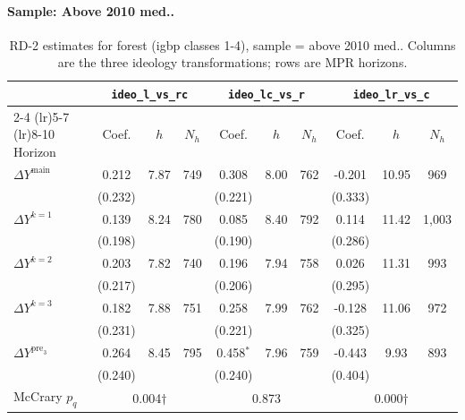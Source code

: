 \documentclass[11pt]{article}
\begin{document}
\paragraph{Sample: Above 2010 med..}
\begin{table}[H]
\centering
\scriptsize
\caption{RD-2 estimates for forest (igbp classes 1-4), sample = above 2010 med..
Columns are the three ideology transformations; rows are MPR horizons.}
\label{tab:rd2_forest_above}
\begin{tabular}{l ccc ccc ccc}
\toprule
 & \multicolumn{3}{c}{\texttt{ideo\_l\_vs\_rc}}
 & \multicolumn{3}{c}{\texttt{ideo\_lc\_vs\_r}}
 & \multicolumn{3}{c}{\texttt{ideo\_lr\_vs\_c}} \\
\cmidrule(lr){2-4} \cmidrule(lr){5-7} \cmidrule(lr){8-10}
Horizon & Coef. & $h$ & $N_h$ & Coef. & $h$ & $N_h$ & Coef. & $h$ & $N_h$ \\
\midrule
$\Delta Y^{\text{main}}$ & 0.212 & 7.87 & 749 & 0.308 & 8.00 & 762 & -0.201 & 10.95 & 969 \\
 & (0.232) &  &  & (0.221) &  &  & (0.333) &  &  \\
\addlinespace[1pt]
$\Delta Y^{k=1}$ & 0.139 & 8.24 & 780 & 0.085 & 8.40 & 792 & 0.114 & 11.42 & 1,003 \\
 & (0.198) &  &  & (0.190) &  &  & (0.286) &  &  \\
\addlinespace[1pt]
$\Delta Y^{k=2}$ & 0.203 & 7.82 & 740 & 0.196 & 7.94 & 758 & 0.026 & 11.31 & 993 \\
 & (0.217) &  &  & (0.206) &  &  & (0.295) &  &  \\
\addlinespace[1pt]
$\Delta Y^{k=3}$ & 0.182 & 7.88 & 751 & 0.258 & 7.99 & 762 & -0.128 & 11.06 & 972 \\
 & (0.231) &  &  & (0.221) &  &  & (0.325) &  &  \\
\addlinespace[1pt]
$\Delta Y^{\text{pre}_3}$ & 0.264 & 8.45 & 795 & 0.458$^{*}$ & 7.96 & 759 & -0.443 & 9.93 & 893 \\
 & (0.240) &  &  & (0.240) &  &  & (0.404) &  &  \\
\addlinespace[1pt]
\midrule
McCrary $p_q$ & \multicolumn{3}{c}{0.004$\dagger$} & \multicolumn{3}{c}{0.873} & \multicolumn{3}{c}{0.000$\dagger$} \\
\bottomrule
\end{tabular}
\end{table}
\end{document}
